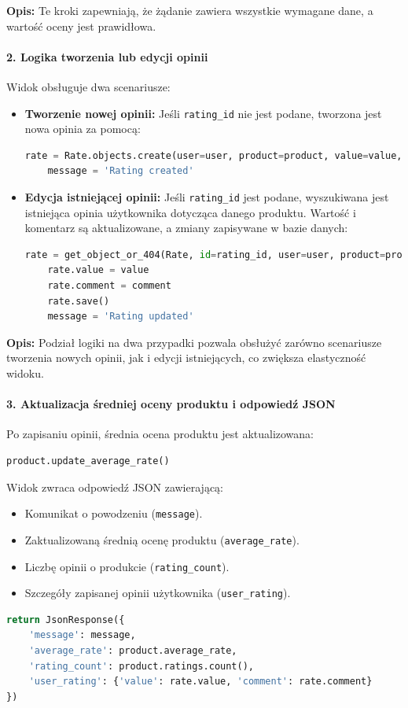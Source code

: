 \documentclass[12pt,a4paper,oneside]{article}
\theoremstyle{definition}
\numberwithin{equation}{section}
\begin{document}
\textbf{Opis:}  
Te kroki zapewniają, że żądanie zawiera wszystkie wymagane dane, a wartość oceny jest prawidłowa.

\paragraph{2. Logika tworzenia lub edycji opinii}
Widok obsługuje dwa scenariusze:
\begin{itemize}
    \item \textbf{Tworzenie nowej opinii:} Jeśli \texttt{rating\_id} nie jest podane, tworzona jest nowa opinia za pomocą:
    \begin{lstlisting}[language=Python]
    rate = Rate.objects.create(user=user, product=product, value=value, comment=comment)
    message = 'Rating created'
    \end{lstlisting}
    \item \textbf{Edycja istniejącej opinii:} Jeśli \texttt{rating\_id} jest podane, wyszukiwana jest istniejąca opinia użytkownika dotycząca danego produktu. Wartość i komentarz są aktualizowane, a zmiany zapisywane w bazie danych:
    \begin{lstlisting}[language=Python]
    rate = get_object_or_404(Rate, id=rating_id, user=user, product=product)
    rate.value = value
    rate.comment = comment
    rate.save()
    message = 'Rating updated'
    \end{lstlisting}
\end{itemize}

\textbf{Opis:}  
Podział logiki na dwa przypadki pozwala obsłużyć zarówno scenariusze tworzenia nowych opinii, jak i edycji istniejących, co zwiększa elastyczność widoku.

\paragraph{3. Aktualizacja średniej oceny produktu i odpowiedź JSON}
Po zapisaniu opinii, średnia ocena produktu jest aktualizowana:
\begin{lstlisting}[language=Python]
product.update_average_rate()
\end{lstlisting}
Widok zwraca odpowiedź JSON zawierającą:
\begin{itemize}
    \item Komunikat o powodzeniu (\texttt{message}).
    \item Zaktualizowaną średnią ocenę produktu (\texttt{average\_rate}).
    \item Liczbę opinii o produkcie (\texttt{rating\_count}).
    \item Szczegóły zapisanej opinii użytkownika (\texttt{user\_rating}).
\end{itemize}
\begin{lstlisting}[language=Python]
return JsonResponse({
    'message': message,
    'average_rate': product.average_rate,
    'rating_count': product.ratings.count(),
    'user_rating': {'value': rate.value, 'comment': rate.comment}
})
\end{lstlisting}
\end{document}
